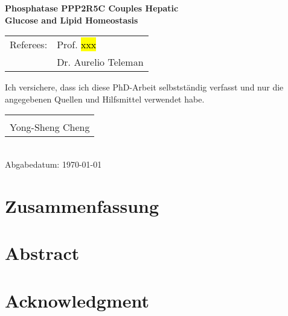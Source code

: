 \documentclass[
     12pt,         %
     a4paper,      %
     BCOR10mm,     %
     DIV14,        %
     listof=totoc,   %
     bibliography=totoc,     %
     index=totoc,     %
     ]{scrreprt}   %
\makeatletter
\newcommand{\sign}[1]{%
  \begin{tabular}[t]{@{}l@{}}
  \makebox[2in]{\hrulefill}\\
  \strut#1\strut
  \end{tabular}%
}
\newcommand{\blankpage}{
\newpage
\thispagestyle{empty}
\mbox{}
\addtocounter{page}{-1}%
\newpage
}
\makeatother
\begin{document}
\begin{titlepage}
\begin{center}
\vspace{0.5\baselineskip}
{\Large \textbf{
Phosphatase PPP2R5C Couples Hepatic\\
\vspace{0.5cm}
Glucose and Lipid Homeostasis}
}

\vfill 
{\large
\begin{tabular}[l]{ll}
Referees: & Prof. \hl{xxx}\\
          & Dr. Aurelio Teleman\\
\end{tabular}
}
\end{center}

\end{titlepage}

\blankpage


\onehalfspacing


\vspace*{100pt}
Ich versichere, dass ich diese PhD-Arbeit selbstständig verfasst und nur die angegebenen
Quellen und Hilfsmittel verwendet habe.

\vspace*{50pt}

\sign{Yong-Sheng Cheng}\\
Abgabedatum: \today

\blankpage

\chapter*{Zusammenfassung}


\blankpage

\chapter*{Abstract}


\blankpage

\chapter*{Acknowledgment}


\blankpage

\tableofcontents
\cleardoublepage
\end{document}
